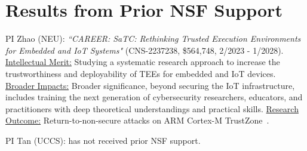\documentclass[11pt,oneside,onecolumn,letterpaper]{article}
\begin{document}
\section{Results from Prior NSF Support}

PI Zhao (NEU): \emph{``CAREER: SaTC: Rethinking Trusted Execution Environments for Embedded and IoT Systems"} (CNS-2237238, \$564,748, 2/2023 - 1/2028).
\ul{Intellectual Merit:} Studying a systematic research approach to increase the trustworthiness and deployability of TEEs for embedded and IoT devices.
\ul{Broader Impacts:} Broader significance, beyond securing the IoT infrastructure, includes training the next generation of cybersecurity researchers, educators, and practitioners with deep theoretical understandings and practical skills.
\ul{Research Outcome:} Return-to-non-secure attacks on ARM Cortex-M TrustZone~\cite{ma2023dac}.

PI Tan (UCCS): has not received prior NSF support.

\newpage


\end{document}
